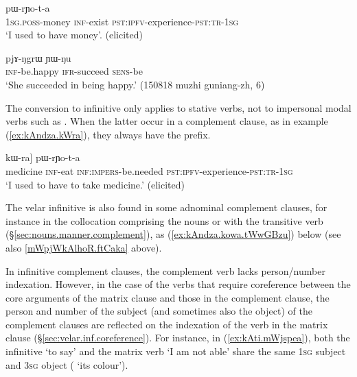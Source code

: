 \begin{exe}
\ex \label{ex:rYo}
\gll   [a-rŋɯl kɤ-tu] pɯ-rɲo-t-a \\
\textsc{1sg}.\textsc{poss}-money \textsc{inf}-exist \textsc{pst}:\textsc{ipfv}-experience-\textsc{pst}:\textsc{tr}-\textsc{1sg} \\
\glt `I used to have money'. (elicited)
\end{exe}

\begin{exe}
\ex \label{ex:kAscit}
 \gll  [kɤ-scit] pjɤ-ŋgrɯ ɲɯ-ŋu  \\
 \textsc{inf}-be.happy \textsc{ifr}-succeed \textsc{sens}-be \\
 \glt `She succeeded in being happy.' (150818 muzhi guniang-zh, 6)
 \end{exe} 
 
The conversion to  infinitive only applies to stative verbs, not to impersonal modal verbs such as . When the latter occur in a complement clause, as in example (\ref{ex:kAndza.kWra}), they always have the  prefix.

\begin{exe}
\ex \label{ex:kAndza.kWra}
\gll  [[smɤn kɤ-ndza] kɯ-ra] pɯ-rɲo-t-a  \\ 
medicine \textsc{inf}-eat \textsc{inf}:\textsc{impers}-be.needed  \textsc{pst}:\textsc{ipfv}-experience-\textsc{pst}:\textsc{tr}-\textsc{1sg} \\
\glt `I used to have to take medicine.' (elicited)
\end{exe} 
 
The velar infinitive is also found in some adnominal complement clauses, for instance in the collocation comprising the nouns  or  with the transitive verb  (§\ref{sec:nouns.manner.complement}), as (\ref{ex:kAndza.kowa.tWwGBzu}) below (see also  \ref{mWpjWkAlhoR.ftCaka} above). 

In infinitive complement clauses, the complement verb lacks person/number indexation. However, in the case of the verbs that require coreference between the core arguments of the matrix clause and those in the complement clause, the person and number of the subject (and sometimes also the object) of the complement clauses are reflected on the indexation of the verb in the matrix clause (§\ref{sec:velar.inf.coreference}). For instance, in (\ref{ex:kAti.mWjspea}), both the infinitive  `to say' and the matrix verb  `I am not able' share the same \textsc{1sg} subject and \textsc{3sg} object ( `its colour').  

